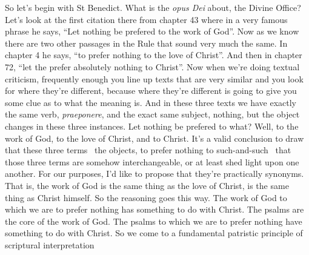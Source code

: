 So let's begin with St Benedict. What is the \emph{opus Dei} about, the Divine Office? Let's look at the first citation there from chapter 43 where in a very famous phrase he says, ``Let nothing be prefered to the work of God''. Now as we know there are two other passages in the Rule that sound very much the same. In chapter 4 he says, ``to prefer nothing to the love of Christ''. And then in chapter 72, ``let the prefer absolutely nothing to Christ''. Now when we're doing textual criticism, frequently enough you line up texts that are very similar and you look for where they're different, because where they're different is going to give you some clue as to what the meaning is. And in these three texts we have exactly the same verb, \emph{praeponere}, and the exact same subject, nothing, but the object changes in these three instances. Let nothing be prefered to what? Well, to the work of God, to the love of Christ, and to Christ. It's a valid conclusion to draw that these three terms \textemdash\ the objects, to prefer nothing to such-and-such \textemdash\ that those three terms are somehow interchangeable, or at least shed light upon one another. For our purposes, I'd like to propose that they're practically synonyms. That is, the work of God is the same thing as the love of Christ, is the same thing as Christ himself. So the reasoning goes this way. The work of God to which we are to prefer nothing has something to do with Christ. The psalms are the core of the work of God. The psalms to which we are to prefer nothing have something to do with Christ. So we come to a fundamental patristic principle of scriptural interpretation




